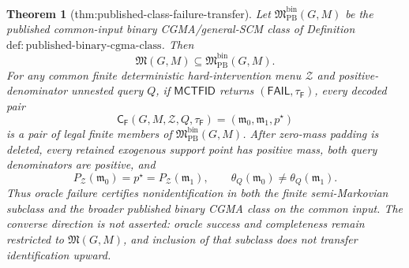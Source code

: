 \documentclass{article}
\newtheorem{theorem}{Theorem}
\begin{document}
\begin{theorem}[thm:published-class-failure-transfer]\label{thm:published-class-failure-transfer}
Let \(\mathfrak M_{\mathrm{PB}}^{\mathrm{bin}}(G,M)\) be the published common-input binary CGMA/general-SCM class of Definition \(\mathrm{def:published\text{-}binary\text{-}cgma\text{-}class}\).  Then
\[
 \mathfrak M(G,M)\subseteq\mathfrak M_{\mathrm{PB}}^{\mathrm{bin}}(G,M).
\]
For any common finite deterministic hard-intervention menu \(\mathcal Z\) and positive-denominator unnested query \(Q\), if \(\mathsf{MCTFID}\) returns \((\mathsf{FAIL},\tau_{\mathsf F})\), every decoded pair
\[
 \mathsf C_{\mathsf F}(G,M,\mathcal Z,Q,\tau_{\mathsf F})
 = (\mathfrak m_0,\mathfrak m_1,p^{\star})
\]
is a pair of legal finite members of \(\mathfrak M_{\mathrm{PB}}^{\mathrm{bin}}(G,M)\).  After zero-mass padding is deleted, every retained exogenous support point has positive mass, both query denominators are positive, and
\[
 P_{\mathcal Z}(\mathfrak m_0)=p^{\star}=P_{\mathcal Z}(\mathfrak m_1),
 \qquad
 \theta_Q(\mathfrak m_0)\ne\theta_Q(\mathfrak m_1).
\]
Thus oracle failure certifies nonidentification in both the finite semi-Markovian subclass and the broader published binary CGMA class on the common input.  The converse direction is not asserted: oracle success and completeness remain restricted to \(\mathfrak M(G,M)\), and inclusion of that subclass does not transfer identification upward.
\end{theorem}
\end{document}
